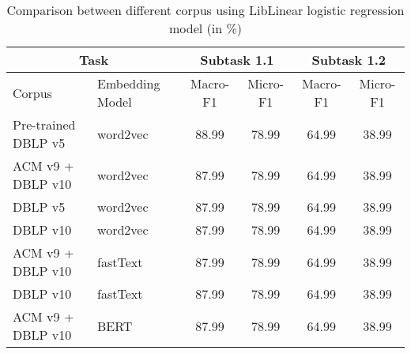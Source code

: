 \begin{table}[htbp!] %
    \begin{tabular}{llcccc}
    \toprule
        \multicolumn{2}{c}{Task}                                                 & \multicolumn{2}{c}{Subtask 1.1} & \multicolumn{2}{c}{Subtask 1.2} \\
    \midrule
        Corpus & Embedding Model                                                               & Macro-F1        & Micro-F1       & Macro-F1        & Micro-F1       \\
    \midrule
        Pre-trained DBLP v5 & word2vec    & 88.99            & 78.99           & 64.99            & 38.99           \\
        ACM v9 + DBLP v10   & word2vec & 87.99            & 78.99           & 64.99            & 38.99           \\
        DBLP v5   & word2vec & 87.99            & 78.99           & 64.99            & 38.99           \\
        DBLP v10   & word2vec & 87.99            & 78.99           & 64.99            & 38.99           \\
        ACM v9 + DBLP v10   & fastText & 87.99            & 78.99           & 64.99            & 38.99           \\
        DBLP v10   & fastText & 87.99            & 78.99           & 64.99            & 38.99           \\
        ACM v9 + DBLP v10   & BERT & 87.99            & 78.99           & 64.99            & 38.99           \\
    \bottomrule
    \end{tabular}
\caption{Comparison between different corpus using LibLinear logistic regression model (in \%)}
\label{tab:corpus}
\end{table}
